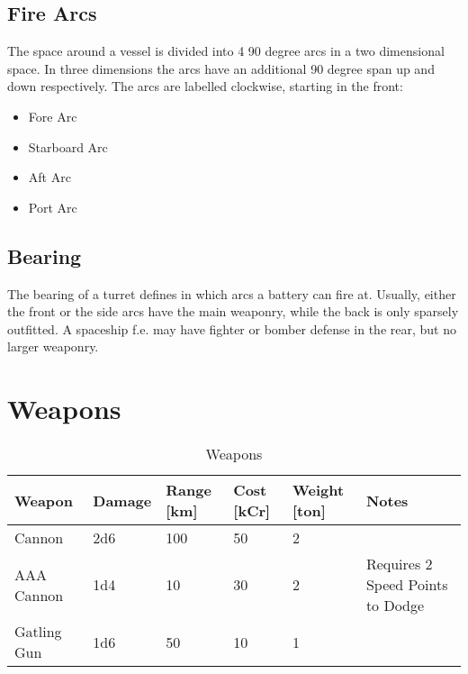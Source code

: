 \subsection{Fire Arcs}
\label{sub:Fire Arcs}

The space around a vessel is divided into 4 90 degree arcs in a two dimensional space. In three dimensions the arcs have an additional 90 degree span up and down respectively. The arcs are labelled clockwise, starting in the front:

\begin{itemize}
  \item Fore Arc
  \item Starboard Arc
  \item Aft Arc
  \item Port Arc
\end{itemize}

\subsection{Bearing}
\label{sub:Bearing}

The bearing of a turret defines in which arcs a battery can fire at. Usually, either the front or the side arcs have the main weaponry, while the back is only sparsely outfitted. A spaceship f.e. may have fighter or bomber defense in the rear, but no larger weaponry.

\section{Weapons}
\label{sec:Weapons}

\begin{table}[H]
  \centering
  \caption{Weapons}
  \label{tab:vessel-weapons}
  \begin{tabularx}{\textwidth}{|l|l|p{1.1cm}|p{1.1cm}|p{1.2cm}|X|}
    \hline
    Weapon      & Damage & Range [km] & Cost [kCr] & Weight [ton] & Notes                                   \\ \hline
    Cannon      & 2d6    & 100 & 50         & 2 & ~                                       \\ \hline
    AAA Cannon  & 1d4    & 10  & 30         & 2 & Requires 2 Speed Points to Dodge        \\ \hline
    Gatling Gun & 1d6    & 50  & 10         & 1 & ~ \\ \hline
  \end{tabularx}
\end{table}

